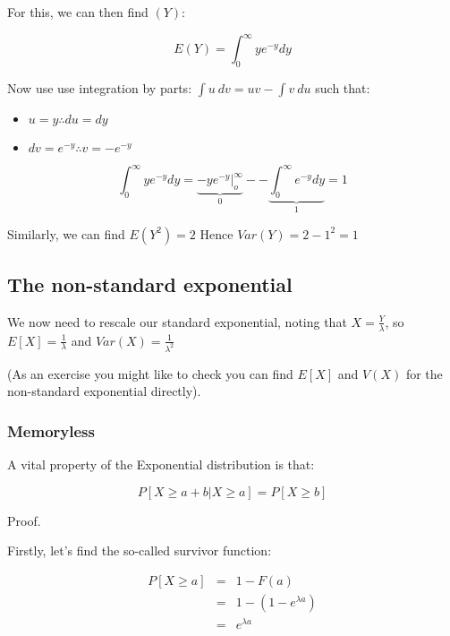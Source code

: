 \documentclass[12pt]{extbook}
\begin{document}
For this, we can then find $(Y)$:

\begin{displaymath}
E(Y) = \int_{0}^{\infty} y e^{-y}dy
\end{displaymath}

Now use use integration by parts: $\int u\ dv = uv - \int v\ du$ such that:
\begin{itemize}
\item[] $u=y \therefore du=dy$
\item[] $dv=e^{-y} \therefore v=-e^{-y}$
\end{itemize}

\begin{displaymath}
\int_{0}^{\infty} y e^{-y}dy = \underbrace{-ye^{-y}|^{\infty}_o}_{0} - -\underbrace{\int_0^{\infty} e^{-y}dy}_{1} = 1
\end{displaymath}

Similarly, we can find $E(Y^2)=2$   Hence $Var(Y) = 2-1^2=1$


\subsection{The non-standard exponential}

We now need to rescale our standard exponential, noting that $X=\frac{Y}{\lambda}$, so $E[X] = \frac{1}{\lambda}$ and $Var(X)=\frac{1}{\lambda^2}$

(As an exercise you might like to check you can find $E[X]$ and $V(X)$ for the non-standard exponential directly).




\subsubsection{Memoryless}

A vital property of the Exponential distribution is that:

\begin{displaymath}
P[X \geq a+b | X \geq a] = P[X \geq b]
\end{displaymath}

Proof.

Firstly, let's find the so-called survivor function:

\begin{eqnarray*}
P[X \geq a] &=& 1-F(a)\\ 
&=& 1 - (1-e^{\lambda a}) \\
&=& e^{\lambda a}
\end{eqnarray*}
\end{document}
